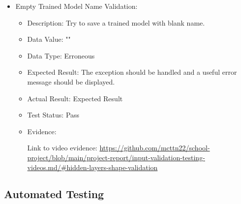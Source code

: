 \documentclass[./project-report/src/latex/project-report.tex]{subfiles}
\begin{document}
\begin{itemize}
\begin{itemize}
        \item Empty Trained Model Name Validation:
            \begin{itemize}
                \item Description: Try to save a trained model with blank name.
                \item Data Value: ""
                \item Data Type: Erroneous
                \item Expected Result: The exception should be handled and a useful error message should be displayed.
                \item Actual Result: Expected Result
                \item Test Status: Pass
                \item Evidence:
                    \begin{figure}[h!]
                    \centering
                    \end{figure}

                    Link to video evidence: \url{https://github.com/mcttn22/school-project/blob/main/project-report/input-validation-testing-videos.md/#hidden-layers-shape-validation}
            \end{itemize}
    \end{itemize}
\end{itemize}

\subsection{Automated Testing}
\end{document}
